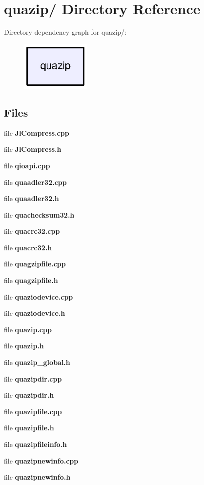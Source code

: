 \section{quazip/ Directory Reference}
\label{dir_297ce0e58b429f346182bca158c2b437}
Directory dependency graph for quazip/:
\nopagebreak
\begin{figure}[H]
\begin{center}
\leavevmode
\includegraphics[width=98pt]{dir_297ce0e58b429f346182bca158c2b437_dep}
\end{center}
\end{figure}
\subsection*{Files}
\begin{DoxyCompactItemize}
\item 
file {\bfseries JlCompress.cpp}
\item 
file {\bfseries JlCompress.h}
\item 
file {\bfseries qioapi.cpp}
\item 
file {\bfseries quaadler32.cpp}
\item 
file {\bfseries quaadler32.h}
\item 
file {\bfseries quachecksum32.h}
\item 
file {\bfseries quacrc32.cpp}
\item 
file {\bfseries quacrc32.h}
\item 
file {\bfseries quagzipfile.cpp}
\item 
file {\bfseries quagzipfile.h}
\item 
file {\bfseries quaziodevice.cpp}
\item 
file {\bfseries quaziodevice.h}
\item 
file {\bfseries quazip.cpp}
\item 
file {\bfseries quazip.h}
\item 
file {\bfseries quazip\_\-global.h}
\item 
file {\bfseries quazipdir.cpp}
\item 
file {\bfseries quazipdir.h}
\item 
file {\bfseries quazipfile.cpp}
\item 
file {\bfseries quazipfile.h}
\item 
file {\bfseries quazipfileinfo.h}
\item 
file {\bfseries quazipnewinfo.cpp}
\item 
file {\bfseries quazipnewinfo.h}
\end{DoxyCompactItemize}
